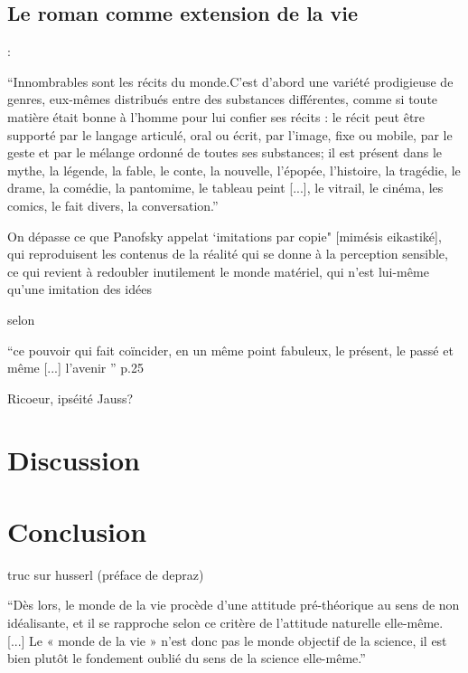 \documentclass[a4paper,10pt]{article}
\begin{document}
		\subsection{Le roman comme extension de la vie}
			\cite{Barthes1966} :
			\begin{center}
				\footnotesize
				\begin{minipage}{0.7\textwidth}
					``Innombrables sont les récits du monde.C'est d'abord une variété prodigieuse de genres, eux-mêmes distribués entre des substances différentes, comme si toute matière était bonne à l'homme pour lui confier ses récits : le récit peut être supporté par le langage articulé, oral ou écrit, par l'image, fixe ou mobile, par le geste et par le mélange ordonné de toutes ses substances; il est présent dans le mythe, la légende, la fable, le conte, la nouvelle, l'épopée, l'histoire, la tragédie, le drame, la comédie, la pantomime, le tableau peint [...], le vitrail, le cinéma, les comics, le fait divers, la conversation.''
				\end{minipage}
			\end{center}
			On dépasse ce que Panofsky appelat  ‘imitations par copie" [mimésis eikastiké], qui reproduisent les contenus de la réalité qui se donne à la perception sensible,
			ce qui revient à redoubler inutilement le monde matériel, qui n’est lui-même qu’une imitation des
			idées \cite{Panofsky1983}
			
			
			selon \cite{Blanchot1959}
			\begin{center}
				\footnotesize
				\begin{minipage}{0.7\textwidth}
					``ce pouvoir qui fait coïncider, en un même point fabuleux, le présent, le passé et même [...] l'avenir '' p.25
				\end{minipage}
			\end{center}
			
			Ricoeur, ipséité
			Jauss?
	\section{Discussion}
	\section*{Conclusion}








truc sur husserl (préface de depraz)
\begin{center}
	\footnotesize
	\begin{minipage}{0.7\textwidth}
		``Dès lors, le monde de la vie procède d’une attitude pré-théorique au sens de non idéalisante, et il se rapproche selon ce critère de l’attitude naturelle elle-même. [...] Le « monde de la vie » n’est donc pas le monde objectif de la science, il est bien plutôt le fondement oublié du sens de
		la science elle-même.''
	\end{minipage}
\end{center}
\end{document}
